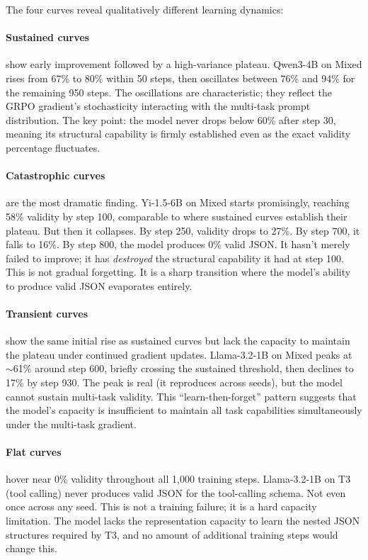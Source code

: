 \documentclass[11pt]{article}
\begin{document}
The four curves reveal qualitatively different learning dynamics:

\paragraph{Sustained curves} show early improvement followed by a high-variance plateau.  Qwen3-4B on Mixed rises from 67\% to 80\% within 50 steps, then oscillates between 76\% and 94\% for the remaining 950 steps.  The oscillations are characteristic; they reflect the GRPO gradient's stochasticity interacting with the multi-task prompt distribution.  The key point: the model never drops below 60\% after step 30, meaning its structural capability is firmly established even as the exact validity percentage fluctuates.

\paragraph{Catastrophic curves} are the most dramatic finding.  Yi-1.5-6B on Mixed starts promisingly, reaching 58\% validity by step 100, comparable to where sustained curves establish their plateau.  But then it collapses.  By step 250, validity drops to 27\%.  By step 700, it falls to 16\%.  By step 800, the model produces 0\% valid JSON.  It hasn't merely failed to improve; it has \emph{destroyed} the structural capability it had at step 100.  This is not gradual forgetting.  It is a sharp transition where the model's ability to produce valid JSON evaporates entirely.

\paragraph{Transient curves} show the same initial rise as sustained curves but lack the capacity to maintain the plateau under continued gradient updates.  Llama-3.2-1B on Mixed peaks at $\sim$61\% around step 600, briefly crossing the sustained threshold, then declines to 17\% by step 930.  The peak is real (it reproduces across seeds), but the model cannot sustain multi-task validity.  This ``learn-then-forget'' pattern suggests that the model's capacity is insufficient to maintain all task capabilities simultaneously under the multi-task gradient.

\paragraph{Flat curves} hover near 0\% validity throughout all 1{,}000 training steps.  Llama-3.2-1B on T3 (tool calling) never produces valid JSON for the tool-calling schema.  Not even once across any seed.  This is not a training failure; it is a hard capacity limitation.  The model lacks the representation capacity to learn the nested JSON structures required by T3, and no amount of additional training steps would change this.
\end{document}
